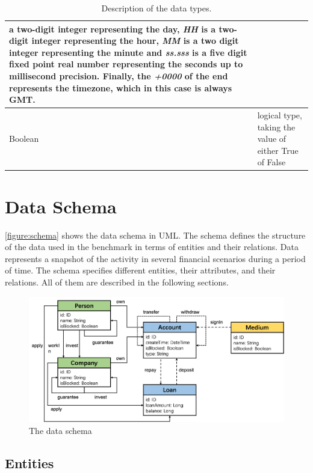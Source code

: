 \begin{table}[h]
\begin{tabular}{|>{\typeCell}p{\attributeColumnWidth}|p{\largeDescriptionColumnWidth}|}
    a two-digit integer representing the day, \textit{HH} is a two-digit integer
    representing the hour, \textit{MM} is a two digit integer representing the
    minute and \textit{ss.sss} is a five digit fixed point real number
    representing the seconds up to millisecond precision. Finally, the
    \textit{+0000} of the end represents the timezone, which in this case is
    always GMT.\\
    \hline
    Boolean &  logical type, taking the value of either True of False\\
    \hline
\end{tabular}
\caption{Description of the data types.}
\label{table:types}
\end{table}

\section{Data Schema}

\autoref{figure:schema} shows the data schema in UML. The schema defines the
structure of the data used in the benchmark in terms of entities and their
relations. Data represents a snapshot of the activity in several financial
scenarios during a period of time. The schema specifies different entities,
their attributes, and their relations. All of them are described in the
following sections.

\begin{figure}[htbp]
	\centering
	\includegraphics[width=\linewidth]{figures/data-schema}
	\caption{The \ldbcfinbench data schema}
	\label{figure:schema}
\end{figure}

\subsection{Entities}

